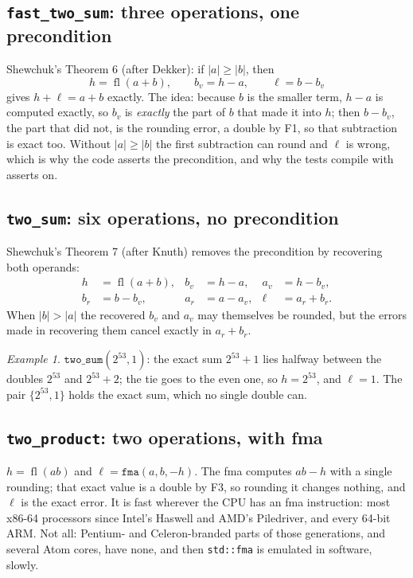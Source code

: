 \documentclass[11pt,a4paper]{article}
\newcommand{\code}[1]{\texttt{#1}}
\newcommand{\fl}{\operatorname{fl}}
\theoremstyle{definition}
\theoremstyle{remark}
\newtheorem*{example}{Example}
\begin{document}
\subsection{\texorpdfstring{\code{fast\_two\_sum}}{fast\_two\_sum}: three operations, one precondition}

Shewchuk's Theorem 6 (after Dekker): if $|a| \ge |b|$, then
\[
  h = \fl(a+b),\qquad b_v = h - a,\qquad \ell = b - b_v
\]
gives $h + \ell = a + b$ exactly. The idea: because $b$ is the smaller term, $h - a$ is
computed exactly, so $b_v$ is \emph{exactly} the part of $b$ that made it into $h$; then
$b - b_v$, the part that did not, is the rounding error, a double by F1, so that subtraction is
exact too. Without $|a| \ge |b|$ the first subtraction can round and $\ell$ is wrong, which is
why the code asserts the precondition, and why the tests compile with asserts on.

\subsection{\texorpdfstring{\code{two\_sum}}{two\_sum}: six operations, no precondition}

Shewchuk's Theorem 7 (after Knuth) removes the precondition by recovering both operands:
\begin{align*}
  h &= \fl(a+b), & b_v &= h - a, & a_v &= h - b_v,\\
  b_r &= b - b_v, & a_r &= a - a_v, & \ell &= a_r + b_r .
\end{align*}
When $|b| > |a|$ the recovered $b_v$ and $a_v$ may themselves be rounded, but the errors made in
recovering them cancel exactly in $a_r + b_r$.

\begin{example}
$\code{two\_sum}(2^{53}, 1)$: the exact sum $2^{53}+1$ lies halfway between the doubles $2^{53}$
and $2^{53}+2$; the tie goes to the even one, so $h = 2^{53}$, and $\ell = 1$. The pair
$\{2^{53}, 1\}$ holds the exact sum, which no single double can.
\end{example}

\subsection{\texorpdfstring{\code{two\_product}}{two\_product}: two operations, with fma}

$h = \fl(ab)$ and $\ell = \code{fma}(a, b, -h)$. The fma computes $ab - h$ with a single rounding;
that exact value is a double by F3, so rounding it changes nothing, and $\ell$ is the exact
error. It is fast wherever the CPU has an fma instruction: most x86-64 processors since Intel's
Haswell and AMD's Piledriver, and every 64-bit ARM. Not all: Pentium- and Celeron-branded parts of
those generations, and several Atom cores, have none, and then \code{std::fma} is emulated in
software, slowly.
\end{document}
